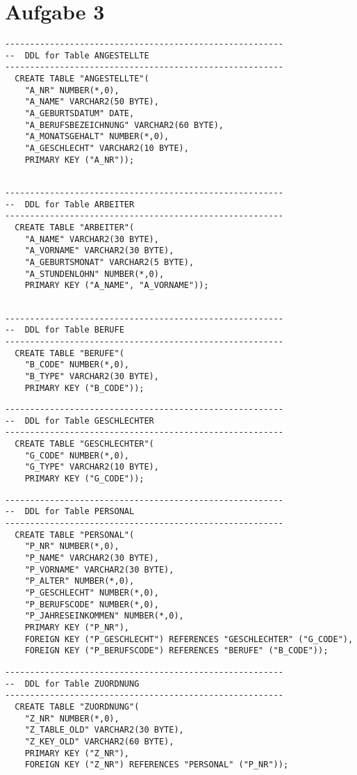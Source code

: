 \documentclass{scrartcl}
\begin{document}
\section*{Aufgabe 3}
\begin{lstlisting}
--------------------------------------------------------
--  DDL for Table ANGESTELLTE
--------------------------------------------------------
  CREATE TABLE "ANGESTELLTE"(
	"A_NR" NUMBER(*,0),
	"A_NAME" VARCHAR2(50 BYTE), 
	"A_GEBURTSDATUM" DATE, 
	"A_BERUFSBEZEICHNUNG" VARCHAR2(60 BYTE), 
	"A_MONATSGEHALT" NUMBER(*,0), 
	"A_GESCHLECHT" VARCHAR2(10 BYTE), 
	PRIMARY KEY ("A_NR"));
	
\end{lstlisting}
\begin{lstlisting}
--------------------------------------------------------
--  DDL for Table ARBEITER
--------------------------------------------------------
  CREATE TABLE "ARBEITER"(	
	"A_NAME" VARCHAR2(30 BYTE), 
	"A_VORNAME" VARCHAR2(30 BYTE), 
	"A_GEBURTSMONAT" VARCHAR2(5 BYTE), 
	"A_STUNDENLOHN" NUMBER(*,0), 
	PRIMARY KEY ("A_NAME", "A_VORNAME"));
  
\end{lstlisting}
\begin{lstlisting}
--------------------------------------------------------
--  DDL for Table BERUFE
--------------------------------------------------------
  CREATE TABLE "BERUFE"(
	"B_CODE" NUMBER(*,0), 
	"B_TYPE" VARCHAR2(30 BYTE), 
	PRIMARY KEY ("B_CODE"));
\end{lstlisting}
\begin{lstlisting}
--------------------------------------------------------
--  DDL for Table GESCHLECHTER
--------------------------------------------------------
  CREATE TABLE "GESCHLECHTER"(
	"G_CODE" NUMBER(*,0), 
	"G_TYPE" VARCHAR2(10 BYTE), 
	PRIMARY KEY ("G_CODE"));
\end{lstlisting}
\begin{lstlisting}
--------------------------------------------------------
--  DDL for Table PERSONAL
--------------------------------------------------------
  CREATE TABLE "PERSONAL"(
	"P_NR" NUMBER(*,0), 
	"P_NAME" VARCHAR2(30 BYTE), 
	"P_VORNAME" VARCHAR2(30 BYTE), 
	"P_ALTER" NUMBER(*,0), 
	"P_GESCHLECHT" NUMBER(*,0), 
	"P_BERUFSCODE" NUMBER(*,0), 
	"P_JAHRESEINKOMMEN" NUMBER(*,0), 
	PRIMARY KEY ("P_NR"),
	FOREIGN KEY ("P_GESCHLECHT") REFERENCES "GESCHLECHTER" ("G_CODE"), 
	FOREIGN KEY ("P_BERUFSCODE") REFERENCES "BERUFE" ("B_CODE"));
\end{lstlisting}
\begin{lstlisting}
--------------------------------------------------------
--  DDL for Table ZUORDNUNG
--------------------------------------------------------
  CREATE TABLE "ZUORDNUNG"(
	"Z_NR" NUMBER(*,0), 
	"Z_TABLE_OLD" VARCHAR2(30 BYTE), 
	"Z_KEY_OLD" VARCHAR2(60 BYTE), 
	PRIMARY KEY ("Z_NR"),
	FOREIGN KEY ("Z_NR") REFERENCES "PERSONAL" ("P_NR"));
\end{lstlisting}
\end{document}
